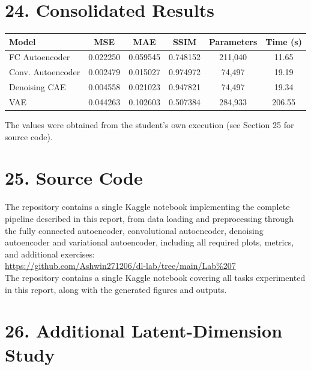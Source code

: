 \documentclass[10pt]{article}
\begin{document}
\section*{24. Consolidated Results}

\begin{center}
\begin{tabular}{|l|c|c|c|c|c|}
\hline
Model & MSE & MAE & SSIM & Parameters & Time (s)\\
\hline
FC Autoencoder & 0.022250 & 0.059545 & 0.748152 & 211{,}040 & 11.65\\
Conv. Autoencoder & 0.002479 & 0.015027 & 0.974972 & 74{,}497 & 19.19\\
Denoising CAE & 0.004558 & 0.021023 & 0.947821 & 74{,}497 & 19.34\\
VAE & 0.044263 & 0.102603 & 0.507384 & 284{,}933 & 206.55\\
\hline
\end{tabular}
\end{center}

The values were obtained from the student's own execution (see Section 25 for source code).

\section*{25. Source Code}

The repository contains a single Kaggle notebook implementing the complete pipeline described in this report, from data loading and preprocessing through the fully connected autoencoder, convolutional autoencoder, denoising autoencoder and variational autoencoder, including all required plots, metrics, and additional exercises:\\

    \hspace{25mm}  \url{https://github.com/Ashwin271206/dl-lab/tree/main/Lab%207}\\

The repository contains a single Kaggle notebook covering all tasks experimented in this report, along with the generated figures and outputs.

\section*{26. Additional Latent-Dimension Study}
\end{document}
